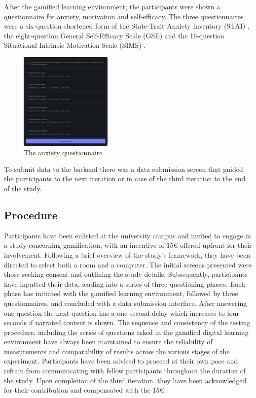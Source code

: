 After the gamified learning environment, the participants were shown a questionnaire for anxiety, motivation and self-efficacy.
The three questionnaires were a six-question shortened form of the State-Trait Anxiety Inventory (STAI) \parencite{marteauDevelopmentSixitemShortform1992}, the eight-question General Self-Efficacy Scale (GSE) \parencite{guayAssessmentSituationalIntrinsic2000} and the 16-question Situational Intrinsic Motivation Scale (SIMS) \parencite{chenValidationNewGeneral2001}.
\begin{figure}[H]
  \centering
  \includegraphics[width=0.4\textwidth]{img/Stai.png}
  \caption{The anxiety questionnaire}
  \label{fig:figureAnxiety}
\end{figure}
To submit data to the backend there was a data submission screen that guided the participants to the next iteration or in case of the third iteration to the end of the study.

\subsection{Procedure}
Participants have been enlisted at the university campus and invited to engage in a study concerning gamification, with an incentive of 15€ offered upfront for their involvement.
Following a brief overview of the study's framework, they have been directed to select both a room and a computer.
The initial screens presented were those seeking consent and outlining the study details. Subsequently, participants have inputted their data, leading into a series of three questioning phases.
Each phase has initiated with the gamified learning environment, followed by three questionnaires, and concluded with a data submission interface.
After answering one question the next question has a one-second delay which increases to four seconds if narrated content is shown.
The sequence and consistency of the testing procedure, including the series of questions asked in the gamified digital learning environment have always been maintained to ensure the reliability of measurements and comparability of results across the various stages of the experiment.
Participants have been advised to proceed at their own pace and refrain from communicating with fellow participants throughout the duration of the study.
Upon completion of the third iteration, they have been acknowledged for their contribution and compensated with the 15€.

